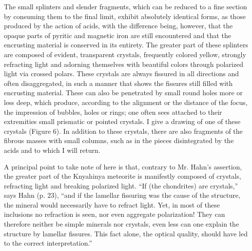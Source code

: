 \documentclass[a4paper, 12pt, oneside]{article}
\begin{document}
The small splinters and slender fragments, which can be reduced to a fine section by consuming them to the final limit, exhibit absolutely identical forms, as those produced by the action of acids, with the difference being, however, that the opaque parts of pyritic and magnetic iron are still encountered and that the encrusting material is conserved in its entirety. The greater part of these splinters are composed of evident, transparent crystals, frequently colored yellow, strongly refracting light and adorning themselves with beautiful colors through polarized light via crossed polars. These crystals are always fissured in all directions and often disaggregated, in such a manner that shows the fissures still filled with encrusting material. These can also be penetrated by small round holes more or less deep, which produce, according to the alignment or the distance of the focus, the impression of bubbles, holes or rings; one often sees attached to their extremities small prismatic or pointed crystals. I give a drawing of one of these crystals (Figure 6). In addition to these crystals, there are also fragments of the fibrous masses with small columns, such as in the pieces disintegrated by the acids and to which I will return.

A principal point to take note of here is that, contrary to Mr. Hahn's assertion, the greater part of the Knyahinya meteorite is manifestly composed of crystals, refracting light and breaking polarized light. ``If (the chondrites) are crystals,'' says Hahn (p. 23), ``and if the lamellar fissuring was the cause of the structure, the mineral would necessarily have to refract light. Yet, in most of these inclusions no refraction is seen, nor even aggregate polarization! They can therefore neither be simple minerals nor crystals, even less can one explain the structure by lamellar fissures. This fact alone, the optical quality, should have led to the correct interpretation.''
\end{document}
